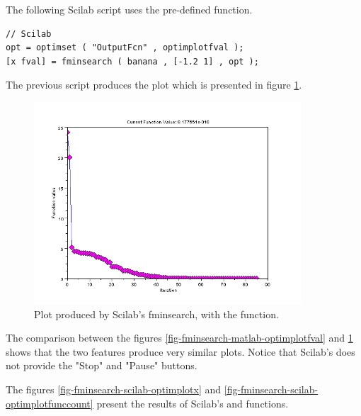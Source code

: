 The following Scilab script uses the 
pre-defined function.

\lstset{language=scilabscript}
\begin{lstlisting}
// Scilab
opt = optimset ( "OutputFcn" , optimplotfval );
[x fval] = fminsearch ( banana , [-1.2 1] , opt );
\end{lstlisting}

The previous script produces the plot which is presented in figure 
\ref{fig-fminsearch-scilab-optimplotfval}.

\begin{figure}
\begin{center}
\includegraphics[width=10cm]{fminsearch/testFminsearchOptimplotfvalScilab.png}
\end{center}
\caption{Plot produced by Scilab's fminsearch, with the  function.}
\label{fig-fminsearch-scilab-optimplotfval}
\end{figure}

The comparison between the figures \ref{fig-fminsearch-matlab-optimplotfval} and 
\ref{fig-fminsearch-scilab-optimplotfval} shows that the two features produce
very similar plots. Notice that Scilab's  does not 
provide the "Stop" and "Pause" buttons.

The figures \ref{fig-fminsearch-scilab-optimplotx} and \ref{fig-fminsearch-scilab-optimplotfunccount}
present the results of Scilab's  and 
functions.

